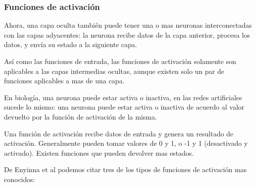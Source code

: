 \documentclass[a4paper,12pt,oneside,spanish]{book}
\begin{document}
\subsubsection{Funciones de activación}
Ahora, una capa oculta también puede tener una o mas neuronas interconectadas con las capas adyacentes: la neurona recibe datos de la capa anterior, procesa los datos, y envía su estado a la siguiente capa.\par

Así como las funciones de entrada, las funciones de activación solamente son aplicables a las capas intermedias ocultas, aunque existen solo un par de funciones aplicables a mas de una capa.\par

En biología, una neurona puede estar activa o inactiva, en las redes artificiales sucede lo mismo: una neurona puede estar activa o inactiva de acuerdo al valor devuelto por la función de activación de la misma.\par

Una función de activación recibe datos de entrada y genera un resultado de activación. Generalmente pueden tomar valores de 0 y 1, o -1 y 1 (desactivado y activado). Existen funciones que pueden devolver mas estados.\par

De Enyinna et al\cite{enyinna} podemos citar tres de los tipos de funciones de activación mas conocidos:
\end{document}
